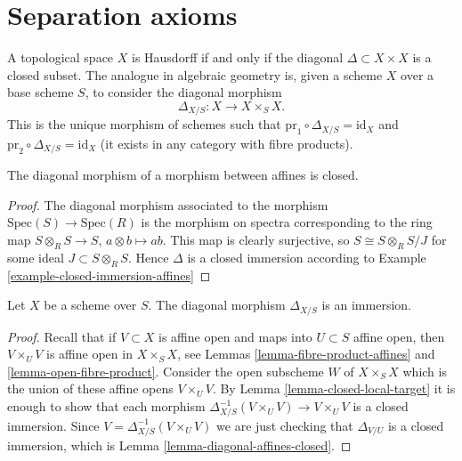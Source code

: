 \section{Separation axioms}
\label{section-separation-axioms}

\noindent
A topological space $X$ is Hausdorff if and only if the
diagonal $\Delta \subset X \times X$ is a closed subset.
The analogue in algebraic geometry is, given a scheme $X$ over
a base scheme $S$, to consider the
diagonal morphism
$$
\Delta_{X/S} : X \longrightarrow X \times_S X.
$$
This is the unique morphism of schemes such that
$\text{pr}_1 \circ \Delta_{X/S} = \text{id}_X$ and
$\text{pr}_2 \circ \Delta_{X/S} = \text{id}_X$ (it exists in
any category with fibre products).

\begin{lemma}
\label{lemma-diagonal-affines-closed}
The diagonal morphism of a morphism between affines is closed.
\end{lemma}

\begin{proof}
The diagonal morphism associated to the morphism
$\text{Spec}(S) \to \text{Spec}(R)$ is the morphism on spectra
corresponding to the ring
map $S \otimes_R S \to S$, $a \otimes b \mapsto ab$.
This map is clearly surjective, so $S \cong S\otimes_R S/J$
for some ideal $J \subset S \otimes_R S$. Hence
$\Delta$ is a closed immersion according to
Example \ref{example-closed-immersion-affines}
\end{proof}

\begin{lemma}
\label{lemma-diagonal-immersion}
Let $X$ be a scheme over $S$.
The diagonal morphism $\Delta_{X/S}$ is an immersion.
\end{lemma}

\begin{proof}
Recall that if $V \subset X$ is affine open and maps into
$U \subset S$ affine open, then $V \times_U V$ is affine open
in $X \times_S X$, see Lemmas \ref{lemma-fibre-product-affines}
and \ref{lemma-open-fibre-product}.
Consider the open subscheme $W$ of $X \times_S X$ which
is the union of these affine opens $V \times_U V$.
By Lemma \ref{lemma-closed-local-target} it is enough
to show that each morphism
$\Delta_{X/S}^{-1}(V \times_U V) \to V \times_U V$ is
a closed immersion. Since $V = \Delta_{X/S}^{-1}(V \times_U V)$
we are just checking that $\Delta_{V/U}$ is a closed
immersion, which is Lemma \ref{lemma-diagonal-affines-closed}.
\end{proof}

